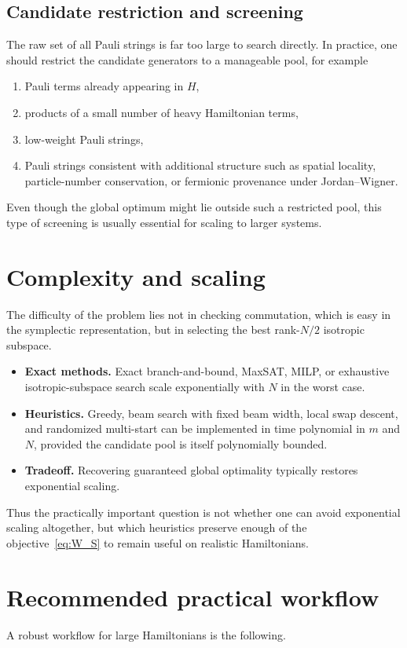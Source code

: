 \documentclass[11pt]{article}
\begin{document}
\subsection{Candidate restriction and screening}
The raw set of all Pauli strings is far too large to search directly. In practice, one should restrict the candidate generators to a manageable pool, for example
\begin{enumerate}[label=\arabic*.]
  \item Pauli terms already appearing in $H$,
  \item products of a small number of heavy Hamiltonian terms,
  \item low-weight Pauli strings,
  \item Pauli strings consistent with additional structure such as spatial locality, particle-number conservation, or fermionic provenance under Jordan--Wigner.
\end{enumerate}
Even though the global optimum might lie outside such a restricted pool, this type of screening is usually essential for scaling to larger systems.

\section{Complexity and scaling}
The difficulty of the problem lies not in checking commutation, which is easy in the symplectic representation, but in selecting the best rank-$N/2$ isotropic subspace.

\begin{itemize}
  \item \textbf{Exact methods.} Exact branch-and-bound, MaxSAT, MILP, or exhaustive isotropic-subspace search scale exponentially with $N$ in the worst case.
  \item \textbf{Heuristics.} Greedy, beam search with fixed beam width, local swap descent, and randomized multi-start can be implemented in time polynomial in $m$ and $N$, provided the candidate pool is itself polynomially bounded.
  \item \textbf{Tradeoff.} Recovering guaranteed global optimality typically restores exponential scaling.
\end{itemize}

Thus the practically important question is not whether one can avoid exponential scaling altogether, but which heuristics preserve enough of the objective~\eqref{eq:W_S} to remain useful on realistic Hamiltonians.

\section{Recommended practical workflow}
A robust workflow for large Hamiltonians is the following.
\end{document}
